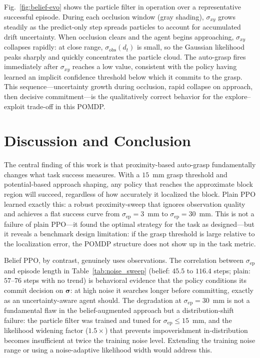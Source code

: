 \documentclass[conference]{IEEEtran}
\newcommand{\sigmaobs}{\sigma_{\text{obs}}}
\newcommand{\sigmaep}{\sigma_{\text{ep}}}
\begin{document}
Fig.~\ref{fig:belief-evo} shows the particle filter in operation over a
representative successful episode.
During each occlusion window (gray shading), $\sigma_{xy}$ grows steadily
as the predict-only step spreads particles to account for accumulated
drift uncertainty.
When occlusion clears and the agent begins approaching, $\sigma_{xy}$
collapses rapidly: at close range, $\sigmaobs(d_t)$ is small, so the
Gaussian likelihood peaks sharply and quickly concentrates the particle
cloud.
The auto-grasp fires immediately after $\sigma_{xy}$ reaches a low value,
consistent with the policy having learned an implicit confidence threshold
below which it commits to the grasp.
This sequence---uncertainty growth during occlusion, rapid collapse on
approach, then decisive commitment---is the qualitatively correct
behavior for the explore--exploit trade-off in this POMDP.

\section{Discussion and Conclusion}
\label{sec:conclusion}

The central finding of this work is that proximity-based auto-grasp
fundamentally changes what task success measures.
With a $15$~mm grasp threshold and potential-based approach shaping,
any policy that reaches the approximate block region will succeed,
regardless of how accurately it localized the block.
Plain PPO learned exactly this: a robust proximity-sweep that ignores
observation quality and achieves a flat success curve from
$\sigmaep=3$~mm to $\sigmaep=30$~mm.
This is not a failure of plain PPO---it found the optimal strategy for
the task as designed---but it reveals a benchmark design limitation:
if the grasp threshold is large relative to the localization error, the
POMDP structure does not show up in the task metric.

Belief PPO, by contrast, genuinely uses observations.
The correlation between $\sigmaep$ and episode length in
Table~\ref{tab:noise_sweep} (belief: $45.5$ to $116.4$ steps; plain:
$57$--$76$ steps with no trend) is behavioral evidence that the policy
conditions its commit decision on $\bm{\sigma}$: at high noise it
searches longer before committing, exactly as an uncertainty-aware agent
should.
The degradation at $\sigmaep=30$~mm is not a fundamental flaw in the
belief-augmented approach but a distribution-shift failure: the particle
filter was trained and tuned for $\sigmaep\le15$~mm, and the likelihood
widening factor ($1.5\times$) that prevents impoverishment in-distribution
becomes insufficient at twice the training noise level.
Extending the training noise range or using a noise-adaptive likelihood
width would address this.
\end{document}
